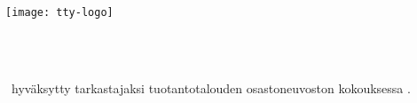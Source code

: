 \makeatletter
\let\thetitle\@title
\let\theauthor\@author
\makeatother

\thispagestyle{empty}

\vspace*{-.5cm}\noindent


\texttt{[image: tty-logo]}

\vspace{6.8cm}

\MakeUppercase{{\large\textbf{\textsf{%
\uppercase{\theauthor} \\
\thetitle \\
}}}}
\textsf{\documenttype}

\vspace{8.7cm} %

\begin{flushright}

\begin{minipage}[c]{6.8cm}
\begin{spacing}{1.0}
\begin{flushleft}
\nohyphens{\inspector\ hyväksytty tarkastajaksi tuotantotalouden osastoneuvoston kokouksessa \approvaldate.}
\end{flushleft}
\end{spacing}
\end{minipage}
\end{flushright}

\cleardoublepage
